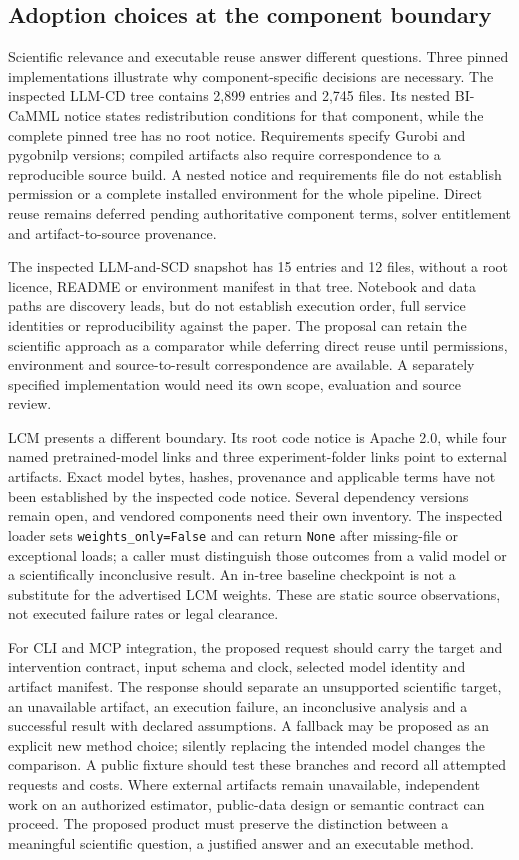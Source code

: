 \subsection{Adoption choices at the component boundary}

Scientific relevance and executable reuse answer different questions. Three pinned implementations illustrate why component-specific decisions are necessary. The inspected LLM-CD tree contains 2,899 entries and 2,745 files. Its nested BI-CaMML notice states redistribution conditions for that component, while the complete pinned tree has no root notice. Requirements specify Gurobi and pygobnilp versions; compiled artifacts also require correspondence to a reproducible source build. A nested notice and requirements file do not establish permission or a complete installed environment for the whole pipeline. Direct reuse remains deferred pending authoritative component terms, solver entitlement and artifact-to-source provenance.~\citep{exec28_lm_artifacts}

The inspected LLM-and-SCD snapshot has 15 entries and 12 files, without a root licence, README or environment manifest in that tree. Notebook and data paths are discovery leads, but do not establish execution order, full service identities or reproducibility against the paper. The proposal can retain the scientific approach as a comparator while deferring direct reuse until permissions, environment and source-to-result correspondence are available. A separately specified implementation would need its own scope, evaluation and source review.~\citep{exec28_lm_artifacts}

LCM presents a different boundary. Its root code notice is Apache 2.0, while four named pretrained-model links and three experiment-folder links point to external artifacts. Exact model bytes, hashes, provenance and applicable terms have not been established by the inspected code notice. Several dependency versions remain open, and vendored components need their own inventory. The inspected loader sets \texttt{weights\_only=False} and can return \texttt{None} after missing-file or exceptional loads; a caller must distinguish those outcomes from a valid model or a scientifically inconclusive result. An in-tree baseline checkpoint is not a substitute for the advertised LCM weights. These are static source observations, not executed failure rates or legal clearance.~\citep{exec28_lm_artifacts}

For CLI and MCP integration, the proposed request should carry the target and intervention contract, input schema and clock, selected model identity and artifact manifest. The response should separate an unsupported scientific target, an unavailable artifact, an execution failure, an inconclusive analysis and a successful result with declared assumptions. A fallback may be proposed as an explicit new method choice; silently replacing the intended model changes the comparison. A public fixture should test these branches and record all attempted requests and costs. Where external artifacts remain unavailable, independent work on an authorized estimator, public-data design or semantic contract can proceed. The proposed product must preserve the distinction between a meaningful scientific question, a justified answer and an executable method.

